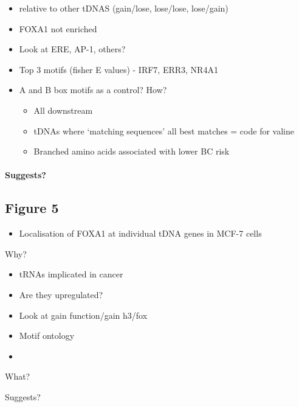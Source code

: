 \documentclass[
  12pt,
]{article}
\providecommand{\tightlist}{%
  \setlength{\itemsep}{0pt}\setlength{\parskip}{0pt}}
\begin{document}
\begin{itemize}
\item
  relative to other tDNAS (gain/lose, lose/lose, lose/gain)
\item
  FOXA1 not enriched
\item
  Look at ERE, AP-1, others?
\item
  Top 3 motifs (fisher E values) - IRF7, ERR3, NR4A1
\item
  A and B box motifs as a control?
  How?

  \begin{itemize}
  \item
    All downstream
  \item
    tDNAs where `matching sequences' all best matches = code for valine
  \item
    Branched amino acids associated with lower BC risk
  \end{itemize}
\end{itemize}

\hypertarget{suggests}{%
\paragraph{Suggests?}\label{suggests}}

\hypertarget{figure-5}{%
\subsection{Figure 5}\label{figure-5}}

\begin{itemize}
\tightlist
\item
  Localisation of FOXA1 at individual tDNA genes in MCF-7 cells
\end{itemize}

Why?

\begin{itemize}
\item
  tRNAs implicated in cancer
\item
  Are they upregulated?
\item
  Look at gain function/gain h3/fox
\item
  Motif ontology
\item
\end{itemize}

What?

Suggests?
\end{document}
